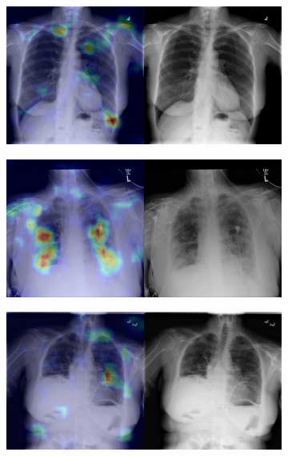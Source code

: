 \begin{figure}[b]
    \centering
    \begin{subfigure}{0.4\textwidth}
        \centering
        \includegraphics[width=1.0\textwidth]{Chapters/5. Conclusiones/img/Infiltration/1_1_00000147_000.png}
    \end{subfigure}
    \begin{subfigure}{0.4\textwidth}
        \centering
        \includegraphics[width=1.0\textwidth]{Chapters/5. Conclusiones/img/Infiltration/1_1_00000181_010.png}
    \end{subfigure}
    \begin{subfigure}{0.4\textwidth}
        \centering
        \includegraphics[width=1.0\textwidth]{Chapters/5. Conclusiones/img/Infiltration/1_1_00000181_062.png}

\end{subfigure}
\end{figure}
